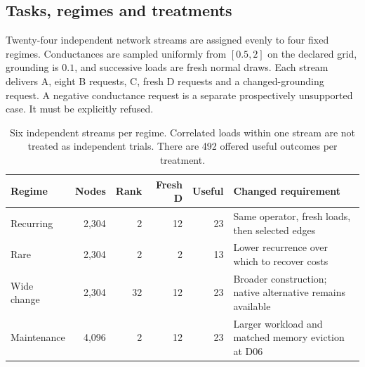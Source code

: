 \subsection{Tasks, regimes and treatments}

Twenty-four independent network streams are assigned evenly to four fixed regimes. Conductances are sampled
uniformly from $[0.5,2]$ on the declared grid, grounding is $0.1$, and successive loads are fresh normal draws.
Each stream delivers A, eight B requests, C, fresh D requests and a changed-grounding request. A negative
conductance request is a separate prospectively unsupported case. It must be explicitly refused.

\begin{table}[htbp]\centering\small
\begin{tabularx}{\linewidth}{@{}L{27mm}rrrrY@{}}\toprule
Regime & Nodes & Rank & Fresh D & Useful & Changed requirement \\\midrule
Recurring & 2,304 & 2 & 12 & 23 & Same operator, fresh loads, then selected edges \\
Rare & 2,304 & 2 & 2 & 13 & Lower recurrence over which to recover costs \\
Wide change & 2,304 & 32 & 12 & 23 & Broader construction; native alternative remains available \\
Maintenance & 4,096 & 2 & 12 & 23 & Larger workload and matched memory eviction at D06 \\\bottomrule
\end{tabularx}
\caption{Six independent streams per regime. Correlated loads within one stream are not treated as independent trials.
There are 492 offered useful outcomes per treatment.}
\end{table}

